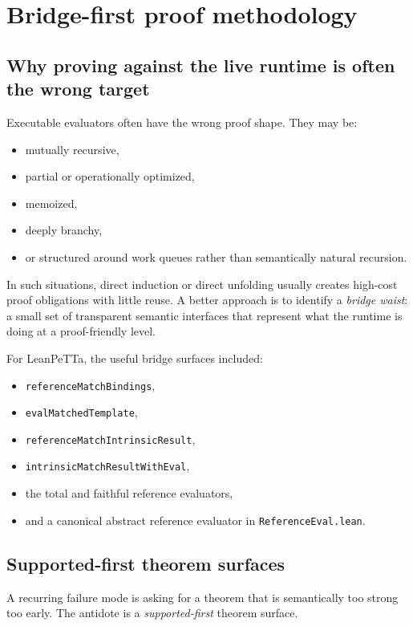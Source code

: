 \documentclass[11pt]{article}
\newcommand{\code}[1]{\texttt{#1}}
\newcommand{\term}[1]{\emph{#1}}
\begin{document}
\section{Bridge-first proof methodology}

\subsection{Why proving against the live runtime is often the wrong target}

Executable evaluators often have the wrong proof shape. They may be:

\begin{itemize}
  \item mutually recursive,
  \item partial or operationally optimized,
  \item memoized,
  \item deeply branchy,
  \item or structured around work queues rather than semantically natural recursion.
\end{itemize}

In such situations, direct induction or direct unfolding usually creates high-cost proof obligations with little reuse. A better approach is to identify a \term{bridge waist}: a small set of transparent semantic interfaces that represent what the runtime is doing at a proof-friendly level.

For LeanPeTTa, the useful bridge surfaces included:

\begin{itemize}
  \item \code{referenceMatchBindings},
  \item \code{evalMatchedTemplate},
  \item \code{referenceMatchIntrinsicResult},
  \item \code{intrinsicMatchResultWithEval},
  \item the total and faithful reference evaluators,
  \item and a canonical abstract reference evaluator in \code{ReferenceEval.lean}.
\end{itemize}

\subsection{Supported-first theorem surfaces}

A recurring failure mode is asking for a theorem that is semantically too strong too early. The antidote is a \term{supported-first} theorem surface.
\end{document}
